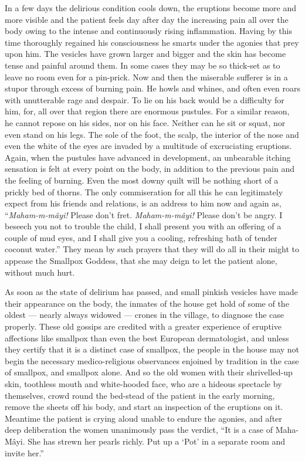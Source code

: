 \documentclass[a4paper, 12pt, oneside, english]{article}
\begin{document}
In a few days the delirious condition cools down, the eruptions become more and more visible and the patient feels day after day the increasing pain all over the body owing to the intense and continuously rising inflammation. Having by this time thoroughly regained his consciousness he smarts under the agonies that prey upon him. The vesicles have grown larger and bigger and the skin has become tense and painful around them. In some cases they may be so thick-set as to leave no room even for a pin-prick. Now and then the miserable sufferer is in a stupor through excess of burning pain. He howls and whines, and often even roars with unutterable rage and despair. To lie on his back would be a difficulty for him, for, all over that region there are enormous pustules. For a similar reason, he cannot repose on his sides, nor on his face. Neither can he sit or squat, nor even stand on his legs. The sole of the foot, the scalp, the interior of the nose and even the white of the eyes are invaded by a multitude of excruciating eruptions. Again, when the pustules have advanced in development, an unbearable itching sensation is felt at every point on the body, in addition to the previous pain and the feeling of burning. Even the most downy quilt will be nothing short of a prickly bed of thorns. The only commiseration for all this he can legitimately expect from his friends and relations, is an address to him now and again as, ``\emph{Maham-m-mâyi!} Please don't fret. \emph{Maham-m-mâyi!} Please don't be angry. I beseech you not to trouble the child, I shall present you with an offering of a couple of mud eyes, and I shall give you a cooling, refreshing bath of tender coconut water.'' They mean by such prayers that they will do all in their might to appease the Smallpox Goddess, that she may deign to let the patient alone, without much hurt.

As soon as the state of delirium has passed, and small pinkish vesicles have made their appearance on the body, the inmates of the house get hold of some of the oldest --- nearly always widowed --- crones in the village, to diagnose the case properly. These old gossips are credited with a greater experience of eruptive affections like smallpox than even the best European dermatologist, and unless they certify that it is a distinct case of smallpox, the people in the house may not begin the necessary medico-religious observances enjoined by tradition in the case of smallpox, and smallpox alone. And so the old women with their shrivelled-up skin, toothless mouth and white-hooded face, who are a hideous spectacle by themselves, crowd round the bed-stead of the patient in the early morning, remove the sheets off his body, and start an inspection of the eruptions on it. Meantime the patient is crying aloud unable to endure the agonies, and after deep deliberation the women unanimously pass the verdict, ``It is a case of Maha-Mâyi. She has strewn her pearls richly. Put up a `Pot' in a separate room and invite her.''
\end{document}
